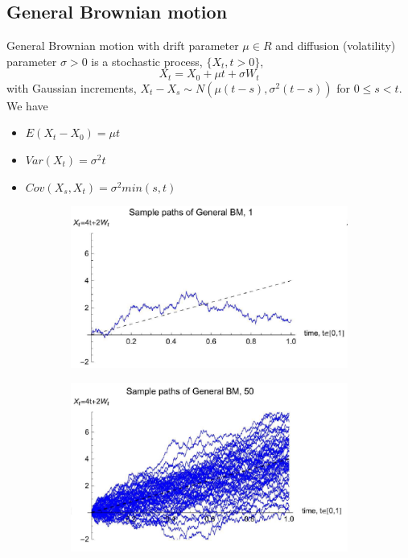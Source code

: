\documentclass[11pt,a4paper]{book}
\theoremstyle{definition}\newtheorem{definition}{Definition}
\theoremstyle{definition}\newtheorem{fact}{Fact}
\theoremstyle{definition}\newtheorem{remark}{Remark}
\theoremstyle{definition}\newtheorem{ex}{Ex.}
\theoremstyle{definition}\newtheorem{project}{Project}
\theoremstyle{definition}\newtheorem{problem}{Problem}
\theoremstyle{definition}\newtheorem{example}{Example}
\numberwithin{theorem}{section}
\numberwithin{corollary}{chapter}
\numberwithin{assumption}{chapter}
\numberwithin{definition}{chapter}
\numberwithin{prop}{chapter}
\numberwithin{notation}{chapter}
\numberwithin{problem}{chapter}
\numberwithin{example}{chapter}
\numberwithin{fact}{chapter}
\numberwithin{ex}{chapter}
\begin{document}
\subsection{General Brownian motion}
General Brownian motion with drift parameter $\mu \in R$ and diffusion (volatility) parameter $\sigma > 0$ is a stochastic process, $\{X_t,t>0\}$,
$$ X_t = X_0 + \mu t + \sigma W_t $$
with Gaussian increments, $X_t - X_s \sim N(\mu(t-s), \sigma^2(t-s))$ for $0 \leq s < t$. We have
\begin{itemize}
\item $E(X_t - X_0) = \mu t$
\item $Var(X_t) = \sigma^2 t$
\item $Cov(X_s, X_t) = \sigma^2 min(s,t)$
\end{itemize}

\begin{figure}[H]
	\begin{subfigure}{0.5\textwidth}
		\centering
		\includegraphics[scale=0.5]{Chapter 1/Chapter1_4.png}
	\end{subfigure}
	\begin{subfigure}{0.5\textwidth}
		\centering
		\includegraphics[scale=0.5]{Chapter 1/Chapter1_5.png}
	\end{subfigure}
\end{figure}
\end{document}

